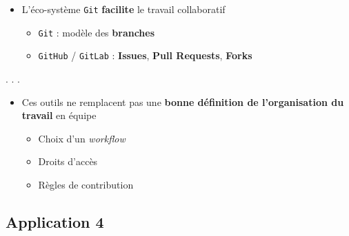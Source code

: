 \documentclass[
  letterpaper,
  DIV=11,
  numbers=noendperiod]{scrartcl}
\providecommand{\tightlist}{%
  \setlength{\itemsep}{0pt}\setlength{\parskip}{0pt}}\usepackage{longtable,booktabs,array}
\begin{document}
\begin{itemize}
\tightlist
\item
  L'éco-système \texttt{Git} {\textbf{facilite} le travail collaboratif}

  \begin{itemize}
  \tightlist
  \item
    \texttt{Git}  : modèle des {\textbf{branches}}
  \item
    \texttt{GitHub}  / \texttt{GitLab}  :
    {\textbf{Issues}, \textbf{Pull Requests}, \textbf{Forks}}
  \end{itemize}
\end{itemize}

. . .

\begin{itemize}
\tightlist
\item
  Ces outils ne remplacent pas une {\textbf{bonne définition de
  l'organisation du travail}} en équipe

  \begin{itemize}
  \tightlist
  \item
    Choix d'un \emph{workflow}
  \item
    Droits d'accès
  \item
    Règles de contribution
  \end{itemize}
\end{itemize}

\hypertarget{application-4}{%
\subsection{Application 4}\label{application-4}}
\end{document}
